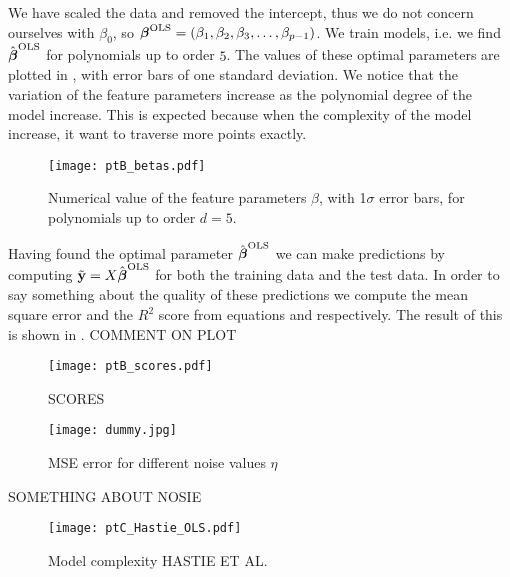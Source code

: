             We have scaled the data and removed the intercept, thus we do not concern ourselves with $\beta_0$, so $\boldsymbol{\beta}^{\text{OLS}} = (\beta_1, \beta_2, \beta_3, \dots, \beta_{p-1})$. We train models, i.e. we find $\hat{\boldsymbol{\beta}}^{\text{OLS}}$ for polynomials up to order $5$. The values of these optimal parameters are plotted in , with error bars of one standard deviation. We notice that the variation of the feature parameters increase as the polynomial degree of the model increase. This is expected because when the complexity of the model increase, it want to traverse more points exactly. 

            \begin{figure}
                \texttt{[image: ptB\_betas.pdf]}
                \caption{Numerical value of the feature parameters $\beta$, with 1$\sigma$ error bars, for polynomials up to order $d=5$.}
                \label{fig:beta_with_standard_deviation}
            \end{figure}

            Having found the optimal parameter $\hat{\boldsymbol{\beta}}^{\text{OLS}}$ we can make predictions by computing $\tilde{\mathbf{y}} = X\hat{\boldsymbol{\beta}}^{\text{OLS}}$ for both the training data and the test data. In order to say something about the quality of these predictions we compute the mean square error and the $R^2$ score from equations  and  respectively. The result of this is shown in . COMMENT ON PLOT
            \begin{figure}
                \texttt{[image: ptB\_scores.pdf]}
                \caption{SCORES}
                \label{fig:mse_and_r2_for_order5}
            \end{figure}

           

            \begin{figure}
                \texttt{[image: dummy.jpg]}
                \caption{MSE error for different noise values $\eta$}
                \label{fig:mse_for_different_noise_ols}
            \end{figure}

            SOMETHING ABOUT NOSIE

            \begin{figure}
                \texttt{[image: ptC\_Hastie\_OLS.pdf]}
                \caption{Model complexity HASTIE ET AL.}
                \label{fig:model_complexity_ols}
            \end{figure}

